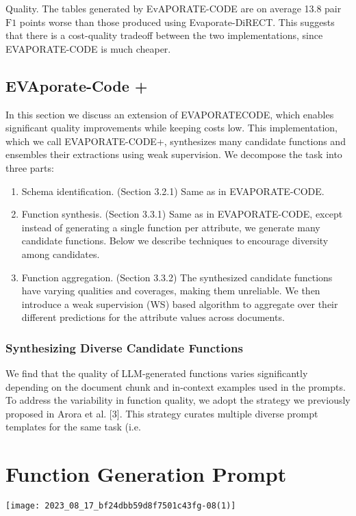 \documentclass[10pt]{article}
\begin{document}
Quality. The tables generated by EvAPORATE-CODE are on average 13.8 pair $\mathrm{F} 1$ points worse than those produced using Evaporate-DiRECT. This suggests that there is a cost-quality tradeoff between the two implementations, since EVAPORATE-CODE is much cheaper.

\subsection{EVAporate-Code +}
In this section we discuss an extension of EVAPORATECODE, which enables significant quality improvements while keeping costs low. This implementation, which we call EVAPORATE-CODE+, synthesizes many candidate functions and ensembles their extractions using weak supervision. We decompose the task into three parts:

\begin{enumerate}
  \item Schema identification. (Section 3.2.1) Same as in EVAPORATE-CODE.

  \item Function synthesis. (Section 3.3.1) Same as in EVAPORATE-CODE, except instead of generating a single function per attribute, we generate many candidate functions. Below we describe techniques to encourage diversity among candidates.

  \item Function aggregation. (Section 3.3.2) The synthesized candidate functions have varying qualities and coverages, making them unreliable. We then introduce a weak supervision (WS) based algorithm to aggregate over their different predictions for the attribute values across documents.

\end{enumerate}

\subsubsection{Synthesizing Diverse Candidate Functions}
We find that the quality of LLM-generated functions varies significantly depending on the document chunk and in-context examples used in the prompts. To address the variability in function quality, we adopt the strategy we previously proposed in Arora et al. [3]. This strategy curates multiple diverse prompt templates for the same task (i.e.

\section{Function Generation Prompt}
\begin{center}
\texttt{[image: 2023\_08\_17\_bf24dbb59d8f7501c43fg-08(1)]}
\end{center}
\end{document}
